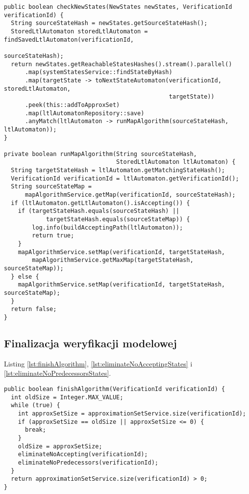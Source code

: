 \begin{minipage}{\linewidth}
\begin{lstlisting}[caption={Implementacja heurystyki pozwalającej na weryfikację modelową w locie.},captionpos=b,label={lst:checkNewStates}]
public boolean checkNewStates(NewStates newStates, VerificationId verificationId) {
  String sourceStateHash = newStates.getSourceStateHash();
  StoredLtlAutomaton storedLtlAutomaton = findSavedLtlAutomaton(verificationId,
                                                                sourceStateHash);
  return newStates.getReachableStatesHashes().stream().parallel()
      .map(systemStatesService::findStateByHash)
      .map(targetState -> toNextStateAutomaton(verificationId, storedLtlAutomaton,
                                               targetState))
      .peek(this::addToApproxSet)
      .map(ltlAutomatonRepository::save)
      .anyMatch(ltlAutomaton -> runMapAlgorithm(sourceStateHash, ltlAutomaton));
}

private boolean runMapAlgorithm(String sourceStateHash,
                                StoredLtlAutomaton ltlAutomaton) {
  String targetStateHash = ltlAutomaton.getMatchingStateHash();
  VerificationId verificationId = ltlAutomaton.getVerificationId();
  String sourceStateMap =
      mapAlgorithmService.getMap(verificationId, sourceStateHash);
  if (ltlAutomaton.getLtlAutomaton().isAccepting()) {
    if (targetStateHash.equals(sourceStateHash) ||
            targetStateHash.equals(sourceStateMap)) {
        log.info(buildAcceptingPath(ltlAutomaton));
        return true;
    }
    mapAlgorithmService.setMap(verificationId, targetStateHash,
        mapAlgorithmService.getMaxMap(targetStateHash, sourceStateMap));
  } else {
    mapAlgorithmService.setMap(verificationId, targetStateHash, sourceStateMap);
  }
  return false;
}

\end{lstlisting}
\end{minipage}


\subsection{Finalizacja weryfikacji modelowej}

Listing \ref{lst:finishAlgorithm}, \ref{lst:eliminateNoAcceptingStates} i \ref{lst:eliminateNoPredecessorsStates}.

\begin{minipage}{\linewidth}
\begin{lstlisting}[caption={Kod obsługujący algorytm w przypadku, gdy nie zakończy się wcześniej.},captionpos=b,label={lst:finishAlgorithm}]
public boolean finishAlgorithm(VerificationId verificationId) {
  int oldSize = Integer.MAX_VALUE;
  while (true) {
    int approxSetSize = approximationSetService.size(verificationId);
    if (approxSetSize == oldSize || approxSetSize <= 0) {
      break;
    }
    oldSize = approxSetSize;
    eliminateNoAccepting(verificationId);
    eliminateNoPredecessors(verificationId);
  }
  return approximationSetService.size(verificationId) > 0;
}
\end{lstlisting}
\end{minipage}

